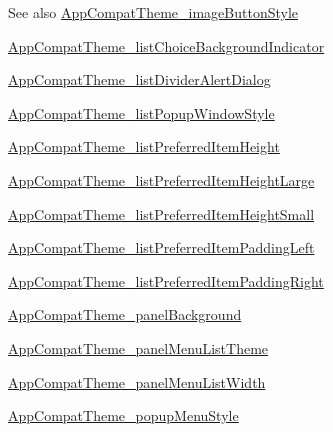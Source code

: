 \begin{DoxySeeAlso}{See also}
\hyperlink{classandroid_1_1support_1_1v7_1_1cardview_1_1R_1_1styleable_a72b5ca7a1aac1855262c99759b66331b}{App\+Compat\+Theme\+\_\+image\+Button\+Style} 

\hyperlink{classandroid_1_1support_1_1v7_1_1cardview_1_1R_1_1styleable_ad2bb60a20b18a930a128f24c8459db7b}{App\+Compat\+Theme\+\_\+list\+Choice\+Background\+Indicator} 

\hyperlink{classandroid_1_1support_1_1v7_1_1cardview_1_1R_1_1styleable_a3b67d0da8fefb257707bd3d70e79ba96}{App\+Compat\+Theme\+\_\+list\+Divider\+Alert\+Dialog} 

\hyperlink{classandroid_1_1support_1_1v7_1_1cardview_1_1R_1_1styleable_a8c1f6899fdf824c15d7b6e5fb01901a3}{App\+Compat\+Theme\+\_\+list\+Popup\+Window\+Style} 

\hyperlink{classandroid_1_1support_1_1v7_1_1cardview_1_1R_1_1styleable_a619c201403d7a5bd57d8bba7b672369e}{App\+Compat\+Theme\+\_\+list\+Preferred\+Item\+Height} 

\hyperlink{classandroid_1_1support_1_1v7_1_1cardview_1_1R_1_1styleable_a54f8f73307e3dad436997279e7e73d17}{App\+Compat\+Theme\+\_\+list\+Preferred\+Item\+Height\+Large} 

\hyperlink{classandroid_1_1support_1_1v7_1_1cardview_1_1R_1_1styleable_a2edb3e97a83d754327dc42bd719ef9d4}{App\+Compat\+Theme\+\_\+list\+Preferred\+Item\+Height\+Small} 

\hyperlink{classandroid_1_1support_1_1v7_1_1cardview_1_1R_1_1styleable_ae88ee6cfa6fa7463687b22b65c5090eb}{App\+Compat\+Theme\+\_\+list\+Preferred\+Item\+Padding\+Left} 

\hyperlink{classandroid_1_1support_1_1v7_1_1cardview_1_1R_1_1styleable_a12084f5e81db166fdb702be49115eaf3}{App\+Compat\+Theme\+\_\+list\+Preferred\+Item\+Padding\+Right} 

\hyperlink{classandroid_1_1support_1_1v7_1_1cardview_1_1R_1_1styleable_a094e72d54827cbb597f966b9f78f4ef2}{App\+Compat\+Theme\+\_\+panel\+Background} 

\hyperlink{classandroid_1_1support_1_1v7_1_1cardview_1_1R_1_1styleable_a11a1d1569aae164daa489fb3f50bd2b6}{App\+Compat\+Theme\+\_\+panel\+Menu\+List\+Theme} 

\hyperlink{classandroid_1_1support_1_1v7_1_1cardview_1_1R_1_1styleable_a2f64ef2552f266f4bb03dd99b70b4aa3}{App\+Compat\+Theme\+\_\+panel\+Menu\+List\+Width} 

\hyperlink{classandroid_1_1support_1_1v7_1_1cardview_1_1R_1_1styleable_a1661ed867614a2bbfea7605ed5b8da7b}{App\+Compat\+Theme\+\_\+popup\+Menu\+Style} 


\end{DoxySeeAlso}
